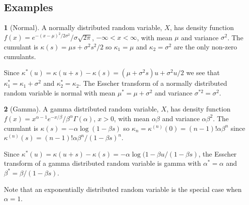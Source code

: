 \documentclass[fleqn]{amsart}
\theoremstyle{definition}
\newtheorem*{example}{}
\begin{document}
%
\subsection{Examples}
\begin{example}[Normal]
A normally distributed random variable, \(X\), has density function 
\(f(x) = e^{-(x - \mu)^2/2\sigma^2}/\sigma\sqrt{2\pi}\), \(-\infty<x<\infty\),
with mean \(\mu\) and variance \(\sigma^2\).
The cumulant is \(\kappa(s) = \mu s + \sigma^2s^2/2\) so
\(\kappa_1 = \mu\) and \(\kappa_2 = \sigma^2\) are the only non-zero
cumulants. 
\end{example}

Since \(\kappa^*(u) = \kappa(u + s) - \kappa(s) = (\mu + \sigma^2s)u + \sigma^2u/2\)
we see that \(\kappa^*_1 = \kappa_1 + \sigma^2\) and \(\kappa^*_2 = \kappa_2\). The
Esscher transform of a normally distributed random variable is normal
with mean \(\mu^* = \mu + \sigma^2\) and variance \(\sigma^{*2} = \sigma^2\).


\begin{example}[Gamma]
A gamma distributed random variable, \(X\), has density function
\(f(x) = x^{\alpha - 1} e^{-x/\beta}/\beta^\alpha\Gamma(\alpha)\), \(x > 0\),
with mean \(\alpha\beta\) and variance \(\alpha\beta^2\).
The cumulant is \(\kappa(s) = -\alpha\log(1 - \beta s)\) so
\(\kappa_n = \kappa^{(n)}(0) = (n-1)!\alpha\beta^n\) since
\(\kappa^{(n)}(s) = (n-1)!\alpha\beta^n/(1 - \beta s)^n\).

Since \(\kappa^*(u) = \kappa(u + s) - \kappa(s) = -\alpha\log (1 - \beta u/(1 - \beta s)\),
the Esscher transform of a gamma distributed random variable is gamma
with \(\alpha^* = \alpha\) and \(\beta^* = \beta/(1 - \beta s)\).

Note that an exponentially distributed random variable is the special case when 
\(\alpha = 1\).
\end{example}
\end{document}
